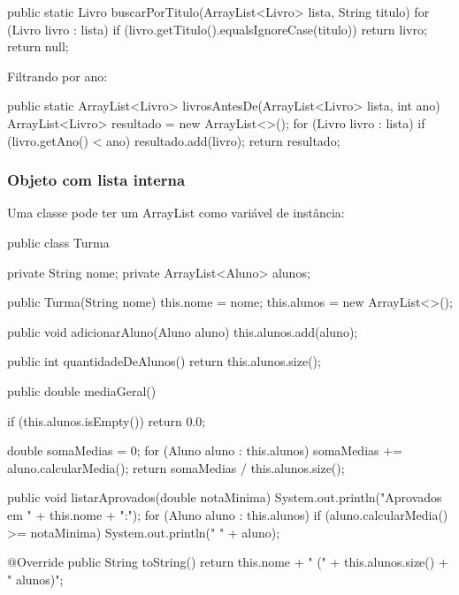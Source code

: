 \documentclass[11pt,a4paper]{article}
\renewcommand{\texttt}[1]{{\color{javaCodeInline}\small\ttfamily #1}}
\begin{document}
\begin{javacode}
public static Livro buscarPorTitulo(ArrayList<Livro> lista, String titulo) {
    for (Livro livro : lista) {
        if (livro.getTitulo().equalsIgnoreCase(titulo)) {
            return livro;
        }
    }
    return null;
}
\end{javacode}

Filtrando por ano:

\begin{javacode}
public static ArrayList<Livro> livrosAntesDe(ArrayList<Livro> lista, int ano) {
    ArrayList<Livro> resultado = new ArrayList<>();
    for (Livro livro : lista) {
        if (livro.getAno() < ano) {
            resultado.add(livro);
        }
    }
    return resultado;
}
\end{javacode}

\subsubsection{Objeto com lista interna}

Uma classe pode ter um \texttt{ArrayList} como variável de instância:

\begin{javacode}
public class Turma {
    private String nome;
    private ArrayList<Aluno> alunos;

    public Turma(String nome) {
        this.nome = nome;
        this.alunos = new ArrayList<>();
    }

    public void adicionarAluno(Aluno aluno) {
        this.alunos.add(aluno);
    }

    public int quantidadeDeAlunos() {
        return this.alunos.size();
    }

    public double mediaGeral() {
        if (this.alunos.isEmpty()) return 0.0;

        double somaMedias = 0;
        for (Aluno aluno : this.alunos) {
            somaMedias += aluno.calcularMedia();
        }
        return somaMedias / this.alunos.size();
    }

    public void listarAprovados(double notaMinima) {
        System.out.println("Aprovados em " + this.nome + ":");
        for (Aluno aluno : this.alunos) {
            if (aluno.calcularMedia() >= notaMinima) {
                System.out.println("  " + aluno);
            }
        }
    }

    @Override
    public String toString() {
        return this.nome + " (" + this.alunos.size() + " alunos)";
    }
}
\end{javacode}
\end{document}
